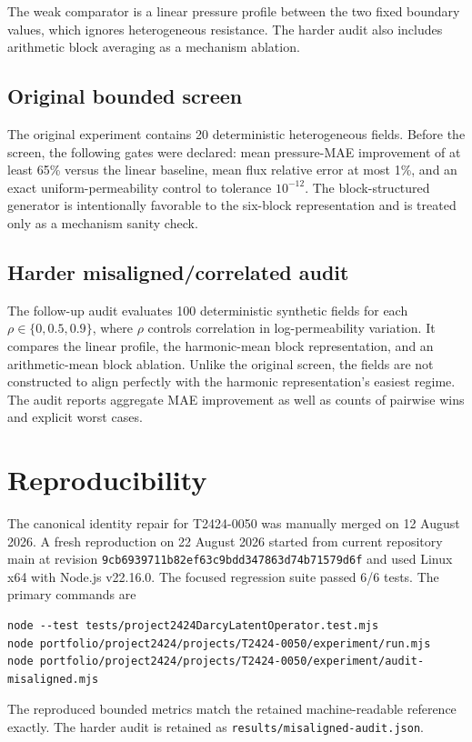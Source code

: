 \documentclass[10pt]{article}
\begin{document}
The weak comparator is a linear pressure profile between the two fixed boundary values, which ignores heterogeneous resistance. The harder audit also includes arithmetic block averaging as a mechanism ablation.

\subsection{Original bounded screen}
The original experiment contains 20 deterministic heterogeneous fields. Before the screen, the following gates were declared: mean pressure-MAE improvement of at least 65\% versus the linear baseline, mean flux relative error at most 1\%, and an exact uniform-permeability control to tolerance $10^{-12}$. The block-structured generator is intentionally favorable to the six-block representation and is treated only as a mechanism sanity check.

\subsection{Harder misaligned/correlated audit}
The follow-up audit evaluates 100 deterministic synthetic fields for each $\rho\in\{0,0.5,0.9\}$, where $\rho$ controls correlation in log-permeability variation. It compares the linear profile, the harmonic-mean block representation, and an arithmetic-mean block ablation. Unlike the original screen, the fields are not constructed to align perfectly with the harmonic representation's easiest regime. The audit reports aggregate MAE improvement as well as counts of pairwise wins and explicit worst cases.

\section{Reproducibility}
The canonical identity repair for T2424-0050 was manually merged on 12 August 2026. A fresh reproduction on 22 August 2026 started from current repository main at revision \texttt{9cb6939711b82ef63c9bdd347863d74b71579d6f} and used Linux x64 with Node.js v22.16.0. The focused regression suite passed 6/6 tests. The primary commands are
\begin{verbatim}
node --test tests/project2424DarcyLatentOperator.test.mjs
node portfolio/project2424/projects/T2424-0050/experiment/run.mjs
node portfolio/project2424/projects/T2424-0050/experiment/audit-misaligned.mjs
\end{verbatim}
The reproduced bounded metrics match the retained machine-readable reference exactly. The harder audit is retained as \texttt{results/misaligned-audit.json}.
\end{document}
